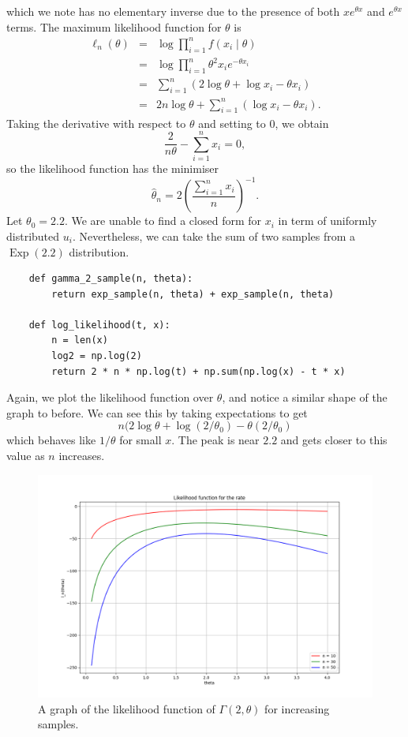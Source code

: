 \documentclass{article}
\begin{document}
which we note has no elementary inverse due to the presence of both \(xe^{\theta x}\) and \(e^{\theta x}\) terms. The maximum likelihood function for \(\theta\) is
\begin{eqnarray*}
    \ell_n(\theta) & = & \log\prod_{i=1}^n f(x_i \mid \theta) \\
                   & = & \log\prod_{i=1}^n \theta^2 x_i e^{-\theta x_i} \\
                   & = & \sum_{i=1}^n (2\log \theta + \log x_i - \theta x_i) \\
                   & = & 2n\log \theta + \sum_{i=1}^n (\log x_i - \theta x_i).
\end{eqnarray*}
Taking the derivative with respect to \(\theta\) and setting to \(0\), we obtain
\[ \frac{2}{n\theta} - \sum_{i=1}^n x_i = 0, \]
so the likelihood function has the minimiser 
\[\hat{\theta}_n = 2 \left(\frac{\sum_{i=1}^n x_i}{n}\right)^{-1}. \]
Let \(\theta_0 = 2.2\). We are unable to find a closed form for \(x_i\) in term of uniformly distributed \(u_i\). Nevertheless, we can take the sum of two samples from a \(\mathop{\mathrm{Exp}}(2.2)\) distribution.

\begin{verbatim}
    def gamma_2_sample(n, theta):
        return exp_sample(n, theta) + exp_sample(n, theta)

    def log_likelihood(t, x):
        n = len(x)
        log2 = np.log(2)
        return 2 * n * np.log(t) + np.sum(np.log(x) - t * x)
\end{verbatim}

Again, we plot the likelihood function over \(\theta\), and notice a similar shape of the graph to before. We can see this by taking expectations to get 
\[ n(2\log\theta +  \log(2/\theta_0) - \theta(2 /\theta_0)\] 
which behaves like \(1/\theta\) for small \(x\). The peak is near \(2.2\) and gets closer to this value as \(n\) increases. 

\begin{figure}
    \centering
    \includegraphics[width=1.0\linewidth]{images/gamma_likelihood.png}
    \caption{A graph of the likelihood function of \(\Gamma(2, \theta)\) for increasing samples.}
\end{figure}
\end{document}
